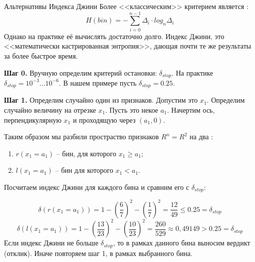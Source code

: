 \begin{frame}{Альтернативы Индекса Джини}
	Более <<классическим>> критерием является 
	:
	\begin{equation}
	H(bin) = - \sum_{i=0}^{n-1} \Delta_i \cdot log_n \Delta_i 
	\end{equation}
	Однако на практике её вычислять достаточно долго. 
	Индекс Джини, это <<математически кастрированная энтропия>>,
	дающая почти те же результаты за более быстрое время.
	\end{frame}
	
	
	
	
	\begin{frame}
	\footnotesize
	\textbf{Шаг 0.} Вручную определим критерий остановки: $\delta_{stop}$. На практике $\delta_{stop}=10^{-3}...10^{-6}$. В нашем примере пусть $\delta_{stop}=0.25$. 
	
	\textbf{Шаг 1.} Определим случайно один из признаков. Допустим это $x_1$. 
	Определим случайно величину на отрезке $x_1$. Пусть это некое $a_1$. 
	Начертим ось, перпендикулярную $x_1$ и проходящую через $(a_1, 0)$.
	\begin{center}
	\begin{tikzpicture}[scale=1.5]
	
	\end{tikzpicture}
	\end{center}
	Таким образом мы разбили простраство признаков
	$R^n=R^2$ на два :
	\begin{enumerate}
	\item $r(x_1=a_1)$ -- бин, для которого $x_1 \geqslant a_1$;
	\item $l(x_1=a_1)$ -- бин для которого $x_1 < a_1$.
	\end{enumerate}
\end{frame}

\begin{frame}
	\small
	Посчитаем индекс Джини для каждого бина и сравним его с $\delta_{stop}$:
	\begin{center}
	\begin{tikzpicture}[scale=1.5]
	
	\end{tikzpicture}
	\end{center}
	\begin{equation*}
	\delta \left(r(x_1=a_1)\right) = 
	1 - \left(\frac{6}{7}\right)^2 - \left( \frac{1}{7}\right)^2 =
	\frac{12}{49} \leqslant 0.25 = \delta_{stop}
	\end{equation*}
	\begin{equation*}
	\delta \left(l(x_1=a_1)\right) = 
	1 - \left( \frac{13}{23} \right)^2 - \left( \frac{10}{23} \right)^2 
	= \frac{260}{529} \approx 0,49149 > 0.25 = \delta_{stop}
	\end{equation*}
	Если индекс Джини не больше $\delta_{stop}$, то в рамках данного бина выносим 
	вердикт (отклик). Иначе повторяем шаг 1, в рамках выбранного бина.
\end{frame}

